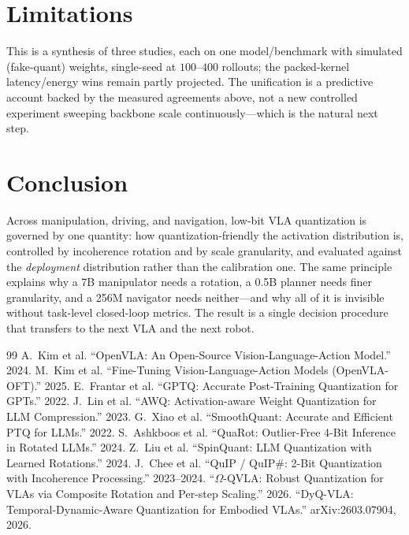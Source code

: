 \documentclass[11pt]{article}
\begin{document}
\section{Limitations}
This is a synthesis of three studies, each on one model/benchmark with simulated (fake-quant)
weights, single-seed at $100$--$400$ rollouts; the packed-kernel latency/energy wins remain partly
projected. The unification is a predictive account backed by the measured agreements above, not a
new controlled experiment sweeping backbone scale continuously---which is the natural next step.

\section{Conclusion}
Across manipulation, driving, and navigation, low-bit VLA quantization is governed by one quantity:
how quantization-friendly the activation distribution is, controlled by incoherence rotation and by
scale granularity, and evaluated against the \emph{deployment} distribution rather than the
calibration one. The same principle explains why a 7B manipulator needs a rotation, a 0.5B planner
needs finer granularity, and a 256M navigator needs neither---and why all of it is invisible without
task-level closed-loop metrics. The result is a single decision procedure that transfers to the next
VLA and the next robot.

\begin{thebibliography}{99}
\small
{} A.~Kim et al. ``OpenVLA: An Open-Source Vision-Language-Action Model.'' 2024.
 M.~Kim et al. ``Fine-Tuning Vision-Language-Action Models (OpenVLA-OFT).'' 2025.
 E.~Frantar et al. ``GPTQ: Accurate Post-Training Quantization for GPTs.'' 2022.
 J.~Lin et al. ``AWQ: Activation-aware Weight Quantization for LLM Compression.'' 2023.
 G.~Xiao et al. ``SmoothQuant: Accurate and Efficient PTQ for LLMs.'' 2022.
 S.~Ashkboos et al. ``QuaRot: Outlier-Free 4-Bit Inference in Rotated LLMs.'' 2024.
 Z.~Liu et al. ``SpinQuant: LLM Quantization with Learned Rotations.'' 2024.
 J.~Chee et al. ``QuIP / QuIP\#: 2-Bit Quantization with Incoherence Processing.'' 2023--2024.
 ``$\Omega$-QVLA: Robust Quantization for VLAs via Composite Rotation and Per-step Scaling.'' 2026.
 ``DyQ-VLA: Temporal-Dynamic-Aware Quantization for Embodied VLAs.'' arXiv:2603.07904, 2026.
\end{thebibliography}
\end{document}
